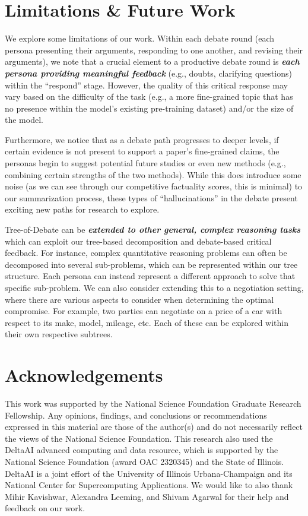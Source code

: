 \documentclass[11pt,dvipsnames]{article}
\begin{document}
\section{Limitations \& Future Work}
\par We explore some limitations of our work. Within each debate round (each persona presenting their arguments, responding to one another, and revising their arguments), we note that a crucial element to a productive debate round is \textbf{\textit{each persona providing meaningful feedback}} (e.g., doubts, clarifying questions)  within the ``respond'' stage. However, the quality of this critical response may vary based on the difficulty of the task (e.g., a more fine-grained topic that has no presence within the model's existing pre-training dataset) and/or the size of the model.
\par Furthermore, we notice that as a debate path progresses to deeper levels, if certain evidence is not present to support a paper's  fine-grained claims, the personas begin to suggest potential future studies or even new methods (e.g., combining certain strengths of the two methods). While this does introduce some noise (as we can see through our competitive factuality scores, this is minimal) to our summarization process, these types of ``hallucinations'' in the debate present exciting new paths for research to explore.
\par Tree-of-Debate can be \textbf{\textit{extended to other general, complex reasoning tasks}} which can exploit our tree-based decomposition and debate-based critical feedback. For instance, complex quantitative reasoning problems can often be decomposed into several sub-problems, which can be represented within our tree structure. Each persona can instead represent a different approach to solve that specific sub-problem. We can also consider extending this to a negotiation setting, where there are various aspects to consider when determining the optimal compromise. For example, two parties can negotiate on a price of a car with respect to its make, model, mileage, etc. Each of these can be explored within their own respective subtrees.

\section{Acknowledgements}
\par This work was supported by the National Science Foundation Graduate Research Fellowship. Any opinions, findings,
and conclusions or recommendations expressed in this material are those of the author(s) and do not necessarily reflect the views of the National Science Foundation. This research also used the DeltaAI advanced computing and data resource, which is supported by the National Science Foundation (award OAC 2320345) and the State of Illinois. DeltaAI is a joint effort of the University of Illinois Urbana-Champaign and its National Center for Supercomputing Applications. We would like to also thank Mihir Kavishwar, Alexandra Leeming, and Shivam Agarwal for their help and feedback on our work.




\appendix



\end{document}
